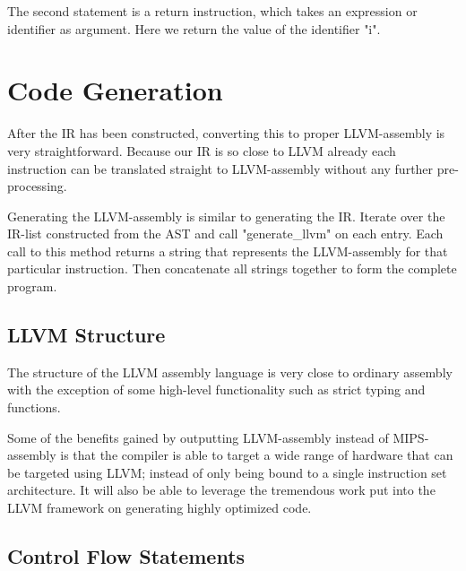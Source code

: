 The second statement is a return instruction, which takes an expression or identifier as argument. Here we return the value of the identifier "i".

\section{Code Generation}

After the IR has been constructed, converting this to proper LLVM-assembly is very straightforward. Because our IR is so close to LLVM already each instruction can be translated straight to LLVM-assembly without any further pre-processing.

Generating the LLVM-assembly is similar to generating the IR. Iterate over the IR-list constructed from the AST and call "generate\_llvm" on each entry. Each call to this method returns a string that represents the LLVM-assembly for that particular instruction. Then concatenate all strings together to form the complete program.

\subsection{LLVM Structure}

The structure of the LLVM assembly language is very close to ordinary assembly with the exception of some high-level functionality such as strict typing and functions.


Some of the benefits gained by outputting LLVM-assembly instead of MIPS-assembly is that the compiler is able to target a wide range of hardware that can be targeted using LLVM; instead of only being bound to a single instruction set architecture. It will also be able to leverage the tremendous work put into the LLVM framework on generating highly optimized code.

\subsection{Control Flow Statements}




